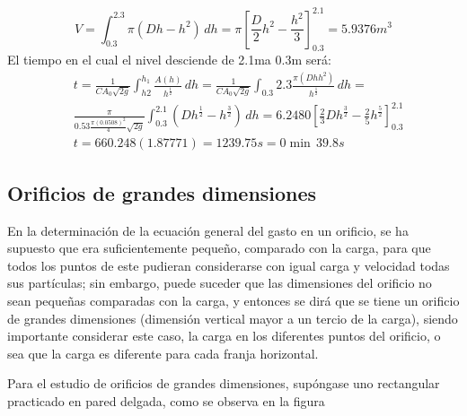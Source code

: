 \begin{equation*}
    V = \int_{0.3}^{2.3}\pi \left(Dh - h^2\right)\,dh =\pi \left[\frac{D}{2}h^2 - \frac{h^2}{3}\right]_{0.3}^{2.1} = 5.9376m^3
\end{equation*}
El tiempo en el cual el nivel desciende de 2.1ma 0.3m será:
\begin{align*}
    &t = \frac{1}{CA_0 \sqrt{2g}}\int_{h2}^{h_1} \frac{A(h)}{h^{\frac{1}{2}}}\,dh = \frac{1}{CA_0 \sqrt{2g}}\int_{0.3}{2.3} \frac{\pi (Dh h^2)}{h^{\frac{1}{2}}}\,dh =\\
    &\frac{\pi}{0.53 \frac{\pi(0.0508)^2}{4} \sqrt{2g}}\int_{0.3}^{2.1} \left(Dh^{\frac{1}{2}} - h^{\frac{3}{2}}\right)\,dh = 6.2480\left[\frac{2}{3}Dh^{\frac{3}{2}} - \frac{2}{5}h^{\frac{5}{2}}\right]_{0.3}^{2.1}\\
    &t = 660.248(1.87771) =1239.75s = 0\min \, 39.8s
\end{align*}

\subsection{Orificios de grandes dimensiones}

En la determinación de la ecuación general del gasto en un orificio, se ha supuesto que era suficientemente pequeño, comparado con la carga, para que todos los puntos de este pudieran considerarse con igual carga y velocidad todas sus partículas; sin embargo, puede suceder que las dimensiones del orificio no sean pequeñas comparadas con la carga, y entonces se dirá que se tiene un orificio de grandes dimensiones (dimensión vertical mayor a un tercio de la carga), siendo importante considerar este caso, la carga en los diferentes puntos del orificio, o sea que la carga es diferente para cada franja horizontal.

Para el estudio de orificios de grandes dimensiones, supóngase uno rectangular practicado en pared delgada, como se observa en la figura

